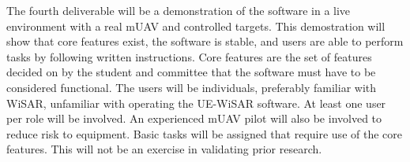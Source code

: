 \documentclass[12pt]{IEEEtran}
\begin{document}
The fourth deliverable will be a demonstration of the software in a
live environment with a real mUAV and controlled targets.  This demostration
will show that core features exist, the software is stable, and users are able to perform tasks by following written
instructions.  Core features are the set of features decided on by the student
and committee that the software must have to be considered functional.  The
users will be individuals, preferably familiar with WiSAR, unfamiliar with
operating the UE-WiSAR software.  At least one user per role will be involved. 
An experienced mUAV pilot will also be involved to reduce risk to equipment. 
Basic tasks will be assigned that require use of the core features.  This will
not be an exercise in validating prior research.

% 
% 
\end{document}
